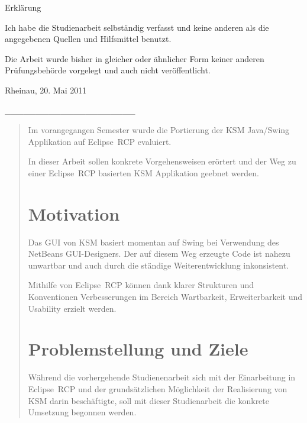 \documentclass[%
12pt,titlepage,abstracton,DIV=10,BCOR=0.5cm]{scrreprt}
\newcommand{\infoAbgabe}{20. Mai 2011} %
\begin{document}
{\huge Erklärung}

\vspace{2cm}
Ich habe die Studienarbeit selbständig verfasst und keine anderen als
die angegebenen Quellen und Hilfsmittel benutzt.

Die Arbeit wurde bisher in gleicher oder ähnlicher Form keiner anderen
Prüfungsbehörde vorgelegt und auch nicht veröffentlicht.

\vspace{1cm}

Rheinau, \infoAbgabe

\vspace{1cm}

\_\_\_\_\_\_\_\_\_\_\_\_\_\_\_\_\_\_\_\_\_

\newpage
\renewcommand{\abstractname}{Zusammenfassung}
\begin{abstract}
Im vorangegangen Semester wurde die Portierung der KSM Java/Swing Applikation
auf Eclipse~RCP evaluiert.

In dieser Arbeit sollen konkrete Vorgehensweisen erörtert und der Weg zu
einer Eclipse~RCP basierten KSM Applikation geebnet werden.

\section*{Motivation}
Das GUI von KSM basiert momentan auf Swing bei Verwendung des
NetBeans GUI-\-Designers. Der auf diesem Weg erzeugte Code ist nahezu
unwartbar und auch durch die ständige Weiterentwicklung inkonsistent.

Mithilfe von Eclipse~RCP können dank klarer Strukturen und
Konventionen Verbesserungen im Bereich Wartbarkeit, Erweiterbarkeit
und Usability erzielt werden.

\section*{Problemstellung und Ziele}
Während die vorhergehende Studienenarbeit \cite{fischer10} sich mit der
Einarbeitung in Eclipse~RCP und der grundsätzlichen Möglichkeit der Realisierung
von KSM darin beschäftigte, soll mit dieser Studienarbeit die konkrete Umsetzung
begonnen werden.
\end{abstract}
\end{document}
